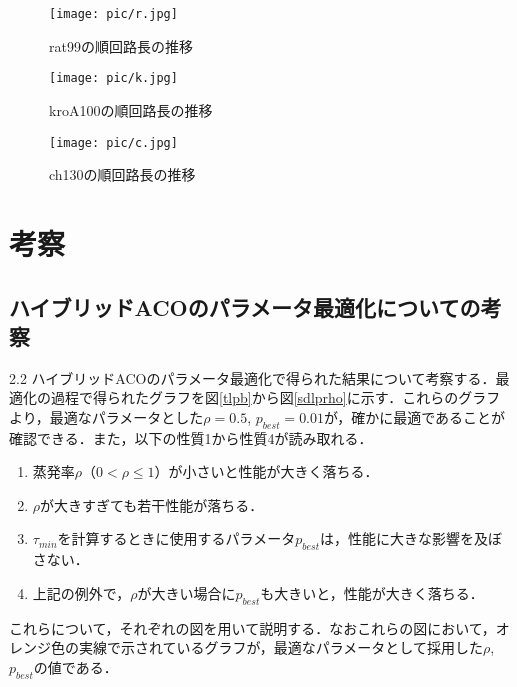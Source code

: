 \documentclass[a4j]{jsarticle}
\begin{document}
\begin{figure}[htbp]
 \begin{minipage}{0.5\hsize}
  \begin{center}
  \texttt{[image: pic/r.jpg]}
  \end{center}
  \caption{rat99の順回路長の推移}
  \label{rat}
 \end{minipage}
 \begin{minipage}{0.5\hsize}
  \begin{center}
  \texttt{[image: pic/k.jpg]}
  \end{center}
  \caption{kroA100の順回路長の推移}
  \label{kro}
 \end{minipage}
\end{figure}
\begin{figure}[htb]
 \begin{center}
  \texttt{[image: pic/c.jpg]}
 \end{center}
  \caption{ch130の順回路長の推移}
  \label{ch}
\end{figure}




\section{考察}
\subsection{ハイブリッドACOのパラメータ最適化についての考察}
2.2 ハイブリッドACOのパラメータ最適化で得られた結果について考察する．最適化の過程で得られたグラフを図\ref{tlpb}から図\ref{sdlprho}に示す．これらのグラフより，最適なパラメータとした$\rho = 0.5$, $p_{best} = 0.01$が，確かに最適であることが確認できる．また，以下の性質1から性質4が読み取れる．
\begin{enumerate}
 \item 蒸発率$\rho$（$0<\rho\leq1$）が小さいと性能が大きく落ちる．
 \item $\rho$が大きすぎても若干性能が落ちる．
 \item $\tau_{min}$を計算するときに使用するパラメータ$p_{best}$は，性能に大きな影響を及ぼさない．
 \item 上記の例外で，$\rho$が大きい場合に$p_{best}$も大きいと，性能が大きく落ちる．
\end{enumerate}
これらについて，それぞれの図を用いて説明する．なおこれらの図において，オレンジ色の実線で示されているグラフが，最適なパラメータとして採用した$\rho$, $p_{best}$の値である．
\end{document}
